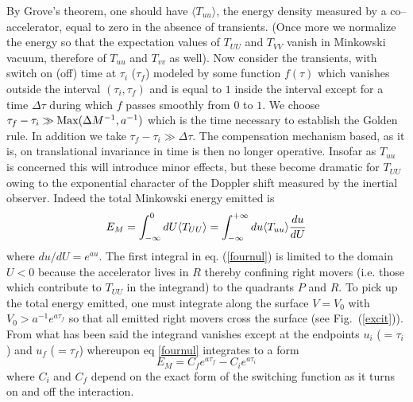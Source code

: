 \documentclass[12pt,oneside]{report}
\begin{document}
By Grove's theorem, one should have $\langle T_{uu} \rangle$, the energy
density measured by a co--accelerator, equal to zero in the absence of
transients. (Once more we normalize the energy so that the expectation values of
$T_{UU}$ and $T_{VV}$ vanish in Minkowski vacuum, therefore of 
$T_{uu}$ and $T_{vv}$ as well). Now consider the transients, with switch
on (off) time at $\tau_i$ ($\tau_f$) modeled by some function $f(\tau)$
which vanishes outside the interval $(\tau_i , \tau_f )$ and is equal to $1$
inside the interval except for a time $\Delta \tau$ during which $f$ passes
smoothly from $0$ to $1$. We choose $\tau_f - \tau_i \gg  {\rm Max} (\Delta M
^{-1}, a^{-1})$ which is the time necessary to establish the Golden rule.
In addition we take $\tau_f - \tau_i \gg  \Delta \tau$. The compensation
mechanism based, as it is, on translational invariance in time is then no
longer operative. Insofar as $T_{uu}$ is concerned this will introduce minor
effects, but these become dramatic for $T_{UU}$ owing to the exponential
character of the Doppler shift measured by the inertial observer. Indeed the
total Minkowski energy emitted is \begin{equation} E_M = \int_{ - \infty}^{0}
dU \langle T_{UU} \rangle =  \int_{ - \infty}^{+ \infty} du \langle T_{uu}\rangle {du \over dU}
\label{fournul} \end{equation}
where $du / dU = e^{au}$. The first integral in eq. (\ref{fournul}) is limited
to the domain $U<0$ because the accelerator lives in $R$ thereby confining
right movers (i.e. those which contribute to $T_{UU}$ in the integrand) to
the quadrants $P$ and $R$. To pick up the total energy emitted, one
must integrate along the surface $V=V_0$ with $V_0 > a^{-1}e^{a\tau_f }$ so 
that all emitted right movers cross 
the surface (see Fig.~(\ref{excit})). From what has been said 
the integrand vanishes except
at the endpoints $u_i$ ($= \tau_i $) and $u_f$ ($= \tau_f $) whereupon eq
\ref{fournul} integrates to a form \begin{equation} E_M = C_f e^{a \tau_f} -
C_i e^{a \tau_i} \label{fourone}
\end{equation}
where $C_i$ and $C_f$ depend on the exact form of the switching function as
it turns on and off the interaction.
\end{document}
